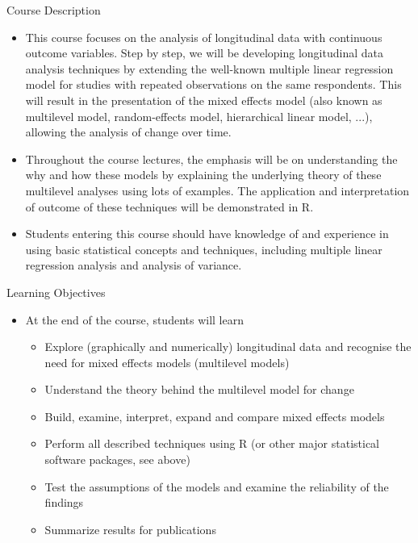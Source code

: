 \documentclass{beamer}
\begin{document}
\begin{frame}{Course Description}
\begin{itemize}
	\item This course focuses on the analysis of longitudinal data with continuous outcome variables. Step by step, we will be developing longitudinal data analysis techniques by extending the well-known multiple linear regression model for studies with repeated observations on the same respondents. This will result in the presentation of the mixed effects model (also known as multilevel model, random-effects model, hierarchical linear model, ...), allowing the analysis of change over time.
	\item Throughout the course lectures, the emphasis will be on understanding the why and how these models by explaining the underlying theory of these multilevel analyses using lots of examples. The application and interpretation of outcome of these techniques will be demonstrated in R.
	\item Students entering this course should have knowledge of and experience in using basic statistical concepts and techniques, including multiple linear regression analysis and analysis of variance.  
\end{itemize}
\end{frame}


\begin{frame}{Learning Objectives}
\begin{itemize}
	\item At the end of the course, students will learn
	\vspace{0.2cm}
	\begin{itemize}
		\item Explore (graphically and numerically) longitudinal data and recognise the need for mixed effects models (multilevel models)
		\vspace{0.2cm}
		\item Understand the theory behind the multilevel model for change
			\vspace{0.2cm}
		\item Build, examine, interpret, expand and compare mixed effects models
			\vspace{0.2cm}
	   \item Perform all described techniques using R (or other major statistical software packages, see above)
	   	\vspace{0.2cm}
		\item Test the assumptions of the models and examine the reliability of the findings 
		\item Summarize results for publications
	\end{itemize}
\end{itemize}
\end{frame}
\end{document}
